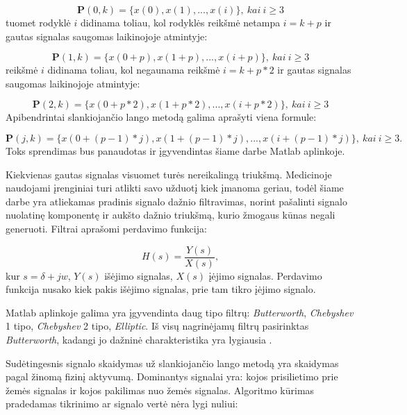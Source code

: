 \documentclass[]{vgtuef}
\begin{document}
\begin{equation}
\mathbf{P}(0,k) = \{ x(0), x(1), ..., x(i) \}, ~ kai~i \geq 3
\end{equation}
tuomet rodyklė $i$ didinama toliau, kol rodyklės reikšmė netampa $i=k+p$ ir gautas signalas saugomas laikinojoje atmintyje:

\begin{equation}
\mathbf{P}(1,k) = \{ x(0+p), x(1+p), ..., x(i+p) \}, ~ kai~i \geq 3
\end{equation}
reikšmė $i$ didinama toliau, kol negaunama reikšmė $i=k+p*2$ ir gautas signalas saugomas laikinojoje atmintyje:

\begin{equation}
\mathbf{P}(2,k) = \{ x(0+p*2),x(1+p*2),...,x(i+p*2) \}, ~ kai~i \geq 3
\end{equation}
Apibendrintai slankiojančio lango metodą galima aprašyti viena formule:

\begin{equation}
\mathbf{P}(j,k) = \{ x(0+(p-1)*j), x(1+(p-1)*j), ..., x(i+(p-1)*j)  \}, ~ kai~i \geq 3.
\end{equation}
Toks sprendimas bus panaudotas ir įgyvendintas šiame darbe Matlab aplinkoje.


Kiekvienas gautas signalas visuomet turės nereikalingą triukšmą. Medicinoje naudojami įrenginiai turi atlikti savo užduotį kiek įmanoma geriau, todėl šiame darbe yra atliekamas pradinis signalo dažnio filtravimas, norint pašalinti signalo nuolatinę komponentę ir aukšto dažnio triukšmą, kurio žmogaus kūnas negali generuoti. Filtrai aprašomi perdavimo funkcija:

\begin{equation}
H(s) = \frac{Y(s)}{X(s)},
\end{equation}
kur $s=\delta + jw$, $Y(s)$ išėjimo signalas, $X(s)$ įėjimo signalas. Perdavimo funkcija nusako kiek pakis išėjimo signalas, prie tam tikro įėjimo signalo. 

Matlab aplinkoje galima yra įgyvendinta daug tipo filtrų: \textit{Butterworth}, \textit{Chebyshev} 1 tipo, \textit{Chebyshev} 2 tipo, \textit{Elliptic}. Iš visų nagrinėjamų filtrų pasirinktas \textit{Butterworth}, kadangi jo dažninė charakteristika yra lygiausia \cite{wiki_filters}.


Sudėtingesnis signalo skaidymas už slankiojančio lango metodą yra skaidymas pagal žinomą fizinį aktyvumą. Dominantys signalai yra: kojos prisilietimo prie žemės signalas ir kojos pakilimas nuo žemės signalas. Algoritmo kūrimas pradedamas tikrinimo ar signalo vertė nėra lygi nuliui:
\end{document}
